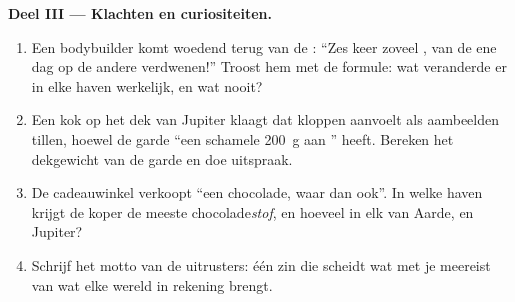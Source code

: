 \begin{problem}
\medskip\noindent\textbf{Deel III --- Klachten en curiositeiten.}
\begin{enumerate}[resume]
  \item Een bodybuilder komt woedend terug van de : ``Zes
        keer zoveel , van de ene dag op de andere verdwenen!''
        Troost hem met de formule: wat veranderde er in elke haven
        werkelijk, en wat nooit?
  \item Een kok op het dek van Jupiter klaagt dat kloppen aanvoelt als
        aambeelden tillen, hoewel de garde ``een schamele \qty{200}{g}
        aan '' heeft. Bereken het dekgewicht van de garde
        en doe uitspraak.
  \item De cadeauwinkel verkoopt ``een  chocolade, waar
        dan ook''. In welke haven krijgt de koper de meeste
        chocolade\emph{stof}, en hoeveel  in elk van Aarde,
         en Jupiter?
  \item Schrijf het motto van de uitrusters: één zin die scheidt wat
        met je meereist van wat elke wereld in rekening brengt.
\end{enumerate}
\end{problem}
